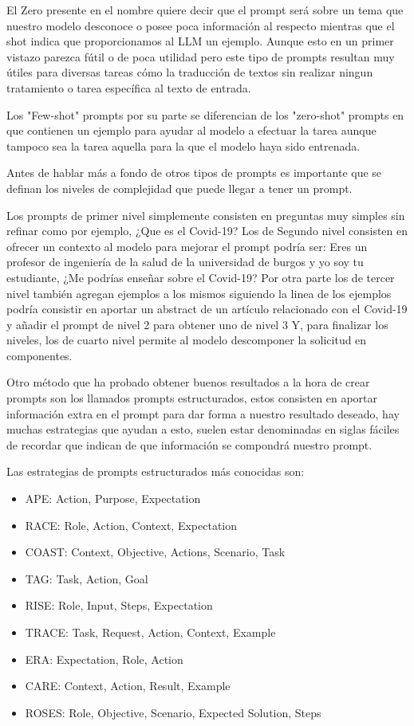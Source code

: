 El Zero presente en el nombre quiere decir que el prompt será sobre un tema que nuestro modelo desconoce o posee poca información al respecto mientras que el shot indica que proporcionamos al LLM un ejemplo. Aunque esto en un primer vistazo parezca fútil o de poca utilidad pero este tipo de prompts resultan muy útiles para diversas tareas cómo la traducción de textos sin realizar ningun tratamiento o tarea específica al texto de entrada.

Los "Few-shot" prompts por su parte se diferencian de los "zero-shot" prompts en que contienen un ejemplo para ayudar al modelo a efectuar la tarea aunque tampoco sea la tarea aquella para la que el modelo haya sido entrenada.

Antes de hablar más a fondo de otros tipos de prompts es importante que se definan los niveles de complejidad que puede llegar a tener un prompt.

Los prompts de primer nivel simplemente consisten en preguntas muy simples sin refinar como por ejemplo, ¿Que es el Covid-19?
Los de Segundo nivel consisten en ofrecer un contexto al modelo para mejorar el prompt podría ser: Eres un profesor de ingeniería de la salud de la universidad de burgos y yo soy tu estudiante, ¿Me podrías enseñar sobre el Covid-19?
Por otra parte los de tercer nivel también agregan ejemplos a los mismos siguiendo la linea de los ejemplos podría consistir en aportar un abstract de un artículo relacionado con el Covid-19 y añadir el prompt de nivel 2 para obtener uno de nivel 3
Y, para finalizar los niveles, los de cuarto nivel permite al modelo descomponer la solicitud en componentes.

Otro método que ha probado obtener buenos resultados a la hora de crear prompts son los llamados prompts estructurados, estos consisten en aportar información extra en el prompt para dar forma a nuestro resultado deseado, hay muchas estrategias que ayudan a esto, suelen estar denominadas en siglas fáciles de recordar que indican de que información se compondrá nuestro prompt.

Las estrategias de prompts estructurados más conocidas son:

\begin{itemize}
    \item APE: Action, Purpose, Expectation
    \item RACE: Role, Action, Context, Expectation
    \item COAST: Context, Objective, Actions, Scenario, Task
    \item TAG: Task, Action, Goal
    \item RISE: Role, Input, Steps, Expectation
    \item TRACE: Task, Request, Action, Context, Example
    \item ERA: Expectation, Role, Action
    \item CARE: Context, Action, Result, Example
    \item ROSES: Role, Objective, Scenario, Expected Solution, Steps
    
\end{itemize}

